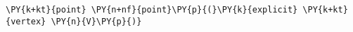 \begin{Verbatim}[commandchars=\\\{\}]
    \PY{k+kt}{point} \PY{n+nf}{point}\PY{p}{(}\PY{k}{explicit} \PY{k+kt}{vertex} \PY{n}{V}\PY{p}{)}
\end{Verbatim}
